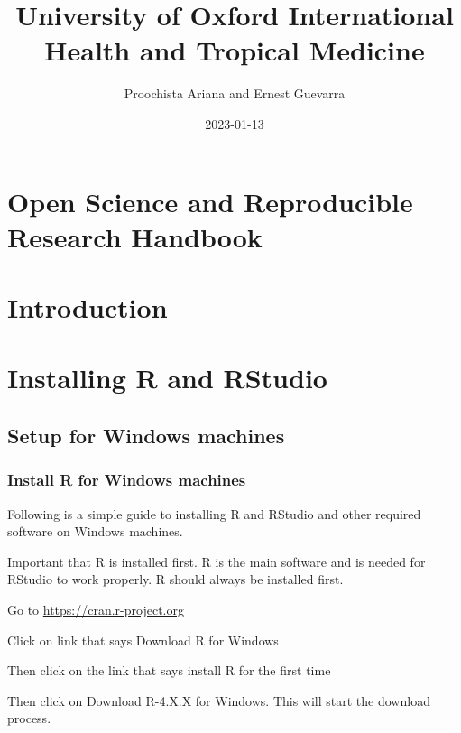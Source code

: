 \documentclass[
  12pt,
]{book}
\title{University of Oxford International Health and Tropical Medicine}
\author{Proochista Ariana and Ernest Guevarra}
\date{2023-01-13}
\begin{document}
\maketitle

{
\hypersetup{linkcolor=}
\setcounter{tocdepth}{1}
\tableofcontents
}
\hypertarget{open-science-and-reproducible-research-handbook}{%
\chapter*{Open Science and Reproducible Research Handbook}\label{open-science-and-reproducible-research-handbook}}

\hypertarget{introduction}{%
\chapter{Introduction}\label{introduction}}

\hypertarget{install-r}{%
\chapter{Installing R and RStudio}\label{install-r}}

\hypertarget{setup-for-windows-machines}{%
\section{Setup for Windows machines}\label{setup-for-windows-machines}}

\hypertarget{install-r-for-windows-machines}{%
\subsection{Install R for Windows machines}\label{install-r-for-windows-machines}}

Following is a simple guide to installing R and RStudio and other required software on Windows machines.

Important that R is installed first. R is the main software and is needed for RStudio to work properly. R should always be installed first.

Go to \url{https://cran.r-project.org}

Click on link that says Download R for Windows

Then click on the link that says install R for the first time

Then click on Download R-4.X.X for Windows. This will start the download process.
\end{document}
